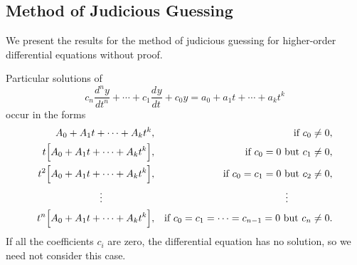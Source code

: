 \documentclass{myart}
\newcommand{\deriv}[3][]{\frac{d^{#1}#2}{d#3^{#1}}}
\begin{document}
\subsection{Method of Judicious Guessing}
\label{subsec:higher order judicious guessing}

We present the results for the method of judicious guessing for
higher-order differential equations without proof.

Particular solutions of
\begin{equation*}
    c_n \deriv[n]{y}{t} + \cdots + c_1 \deriv{y}{t} + c_0 y
  = a_0 + a_1 t + \cdots + a_k t^k
\end{equation*}
occur in the forms
\begin{align*}
     A_0 + A_1 t + \cdots + A_k t^k,
  && \text{if $c_0 \neq 0$}, \\
     t\Big[A_0 + A_1 t + \cdots + A_k t^k\Big],
  && \text{if $c_0 = 0$ but $c_1 \neq 0$}, \\
     t^2\Big[A_0 + A_1 t + \cdots + A_k t^k\Big],
  && \text{if $c_0 = c_1 = 0$ but $c_2 \neq 0$}, \\
  \vdots \hspace{52.25pt} && \vdots \hspace{44.5pt} \\
     t^n\Big[A_0 + A_1 t + \cdots + A_k t^k\Big],
  && \text{if $c_0 = c_1 = \cdots = c_{n-1} = 0$ but $c_n \neq 0$}.
\end{align*}
If all the coefficients $c_i$ are zero, the differential equation has
no solution, so we need not consider this case.
\end{document}
